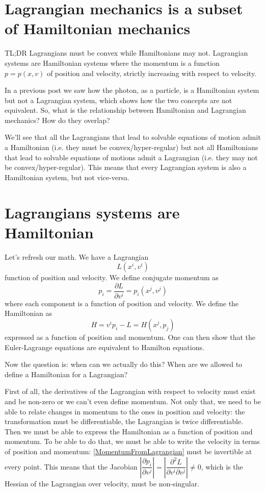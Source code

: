 \documentclass[aps,pra,10pt,floatfix,nofootinbib]{revtex4-1}
\theoremstyle{definition}
\begin{document}
	
\section{Lagrangian mechanics is a subset of Hamiltonian mechanics}

TL;DR Lagrangians must be convex while Hamiltonians may not. Lagrangian systems are Hamiltonian systems where the momentum is a function $p=p(x,v)$ of position and velocity, strictly increasing with respect to velocity.

In a previous post we saw how the photon, as a particle, is a Hamiltonian system but not a Lagrangian system, which shows how the two concepts are not equivalent. So, what is the relationship between Hamiltonian and Lagrangian mechanics? How do they overlap?

We'll see that all the Lagrangians that lead to solvable equations of motion admit a Hamiltonian (i.e. they must be convex/hyper-regular) but not all Hamiltonians that lead to solvable equations of motions admit a Lagrangian (i.e. they may not be convex/hyper-regular). This means that every Lagrangian system is also a Hamiltonian system, but not vice-versa.


\section{Lagrangians systems are Hamiltonian}

Let's refresh our math. We have a Lagrangian
\begin{equation}
\label{Lagrangian}
L(x^i,v^i)
\end{equation} 
function of position and velocity. We define conjugate momentum as
\begin{equation}
\label{MomentumFromLagrangian}
p_i = \frac{\partial L}{\partial v^i} = p_i(x^j,v^j)
\end{equation}
where each component is a function of position and velocity. We define the Hamiltonian as
\begin{equation}
\label{HamiltonianFromLagrangian}
H = v^i p_i - L = H(x^j, p_j)
\end{equation}
expressed as a function of position and momentum. One can then show that the Euler-Lagrange equations are equivalent to Hamilton equations.

Now the question is: when can we actually do this? When are we allowed to define a Hamiltonian for a Lagrangian?

First of all, the derivatives of the Lagrangian with respect to velocity must exist and be non-zero or we can't even define momentum. Not only that, we need to be able to relate changes in momentum to the ones in position and velocity: the transformation must be differentiable, the Lagrangian is twice differentiable. Then we must be able to express the Hamiltonian as a function of position and momentum. To be able to do that, we must be able to write the velocity in terms of position and momentum: \eqref{MomentumFromLagrangian} must be invertible at every point. This means that the  Jacobian $\left| \dfrac{\partial p_i}{\partial v^j} \right| = \left| \dfrac{\partial^2 L}{\partial v^i \partial v^j} \right| \neq 0$, which is the Hessian of the Lagrangian over velocity, must be non-singular.
\end{document}

